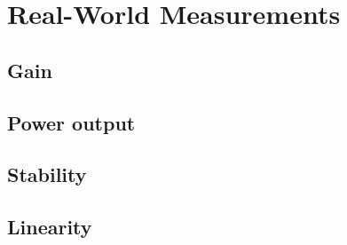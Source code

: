 \chapter{Real-World Measurements}

  \section{Gain}

  \section{Power output}

  \section{Stability}

  \section{Linearity}
